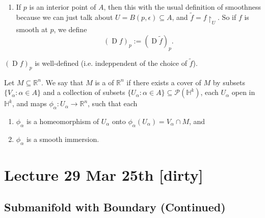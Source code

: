 \documentclass[notoc,notitlepage]{tufte-book}
\DeclareMathOperator{\D}{D}
\begin{document}
\begin{remark}
  \begin{enumerate}
    \item If $p$ is an interior point of $A$, then this  with
      the usual definition of smoothness because we can just talk about $U =
      B(p, \epsilon) \subseteq A$, and $\tilde{f} = f \restriction_{U}$. So if
      $f$ is smooth at $p$, we define
      \begin{equation*}
        (\D f)_p := (\D \tilde{f})_p.
      \end{equation*}
  \end{enumerate}
\end{remark}

 $(\D f)_p$ is well-defined (i.e. indeppendent of the choice of
$\tilde{f}$).

\begin{defn}\label{defn:submanifold_with_boundary}
  Let $M \subseteq \mathbb{R}^n$. We say that $M$ is a  of $\mathbb{R}^n$ if there exists a cover of $M$ by
  subsets $\{ V_\alpha : \alpha \in A \}$ and a collection of subsets $\{
  U_\alpha : \alpha \in A \} \subseteq \mathcal{P}(\mathbb{H}^k)$, each
  $U_\alpha$ open in $\mathbb{H}^k$, and maps $\phi_\alpha : U_\alpha \to
  \mathbb{R}^n$, such that each
  \begin{enumerate}
    \item $\phi_\alpha$ is a homeomorphism of $U_\alpha$ onto
      $\phi_\alpha(U_\alpha) = V_\alpha \cap M$, and
    \item $\phi_\alpha$ is a smooth immersion.
  \end{enumerate}
\end{defn}



\chapter{Lecture 29 Mar 25th [dirty]}%
\label{chp:lecture_29_mar_25th}

\section{Submanifold with Boundary (Continued)}%
\label{sec:submanifold_with_boundary_continued}
\end{document}
